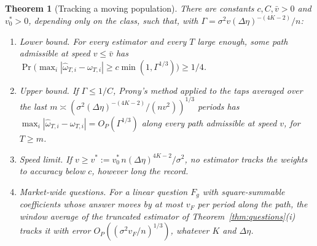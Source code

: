 \documentclass[12pt]{article}
\newtheorem{theorem}{Theorem}[section]
\theoremstyle{definition}
\theoremstyle{remark}
\begin{document}
\begin{theorem}[Tracking a moving population]\label{thm:track}
There are constants $c,C,\bar v>0$ and $v^*_0>0$, depending only on the class, such that, with $\Gamma=\sigma^2v(\Delta\eta)^{-(4K-2)}/n$:
\begin{enumerate}[label=(\roman*),itemsep=1pt]
\item \emph{Lower bound.} For every estimator and every $T$ large enough, some path admissible at speed $v\le\bar v$ has $\Pr\bigl(\max_i|\hat\omega_{T,i}-\omega_{T,i}|\ge c\min(1,\Gamma^{1/3})\bigr)\ge1/4$.
\item \emph{Upper bound.} If $\Gamma\le1/C$, Prony's method applied to the taps averaged over the last $m\asymp(\sigma^2(\Delta\eta)^{-(4K-2)}/(nv^2))^{1/3}$ periods has $\max_i|\hat\omega_{T,i}-\omega_{T,i}|=O_P(\Gamma^{1/3})$ along every path admissible at speed $v$, for $T\ge m$.
\item \emph{Speed limit.} If $v\ge v^*:=v^*_0\,n(\Delta\eta)^{4K-2}/\sigma^2$, no estimator tracks the weights to accuracy below $c$, however long the record.
\item \emph{Market-wide questions.} For a linear question $F_g$ with square-summable coefficients whose answer moves by at most $v_F$ per period along the path, the window average of the truncated estimator of Theorem~\ref{thm:questions}(i) tracks it with error $O_P((\sigma^2v_F/n)^{1/3})$, whatever $K$ and $\Delta\eta$.
\end{enumerate}
\end{theorem}
\end{document}
